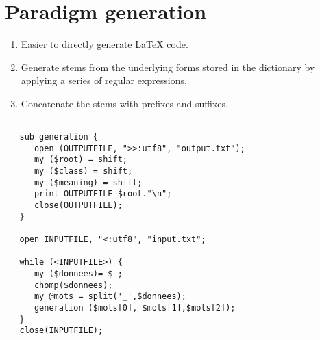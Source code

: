 \documentclass[oldfontcommands,oneside,a4paper,11pt]{article}
\begin{document}
\section{Paradigm generation}
\begin{enumerate}
\item Easier to directly generate \LaTeX{} code.
\item Generate stems from the underlying forms stored in the dictionary by applying a series of regular expressions.
\item Concatenate the stems with prefixes and suffixes.
\end{enumerate}



\begin{verbatim}

   sub generation {
      open (OUTPUTFILE, ">>:utf8", "output.txt");
      my ($root) = shift;
      my ($class) = shift;
      my ($meaning) = shift;
      print OUTPUTFILE $root."\n";
      close(OUTPUTFILE);
   }
	
   open INPUTFILE, "<:utf8", "input.txt";

   while (<INPUTFILE>) {
      my ($donnees)= $_;
      chomp($donnees);
      my @mots = split('_',$donnees);
      generation ($mots[0], $mots[1],$mots[2]);
   }
   close(INPUTFILE);

\end{verbatim} 





\end{document}
